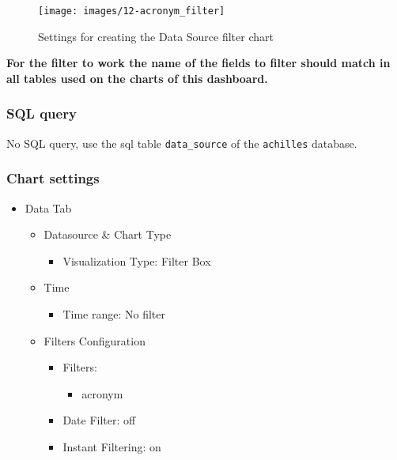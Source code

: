 \documentclass[
]{book}
\providecommand{\tightlist}{%
  \setlength{\itemsep}{0pt}\setlength{\parskip}{0pt}}
\begin{document}
\begin{figure}
\texttt{[image: images/12-acronym\_filter]} \caption{Settings for creating the Data Source filter chart}\label{fig:dataSourceFilter}
\end{figure}

\textbf{For the filter to work the name of the fields to filter should match in all tables used on the charts of this dashboard.}

\hypertarget{sql-query-34}{%
\subsubsection*{SQL query}\label{sql-query-34}}

No SQL query, use the sql table \texttt{data\_source} of the \texttt{achilles} database.

\hypertarget{chart-settings-37}{%
\subsubsection*{Chart settings}\label{chart-settings-37}}

\begin{itemize}
\tightlist
\item
  Data Tab

  \begin{itemize}
  \tightlist
  \item
    Datasource \& Chart Type

    \begin{itemize}
    \tightlist
    \item
      Visualization Type: Filter Box
    \end{itemize}
  \item
    Time

    \begin{itemize}
    \tightlist
    \item
      Time range: No filter
    \end{itemize}
  \item
    Filters Configuration

    \begin{itemize}
    \tightlist
    \item
      Filters:

      \begin{itemize}
      \tightlist
      \item
        acronym
      \end{itemize}
    \item
      Date Filter: off
    \item
      Instant Filtering: on
    \end{itemize}
  \end{itemize}
\end{itemize}
\end{document}
